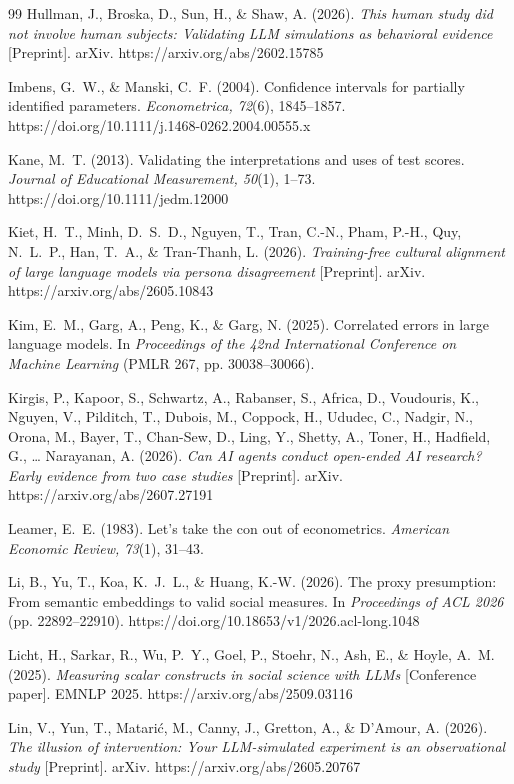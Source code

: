 \documentclass[10pt,letterpaper]{article}
\begin{document}
\begin{thebibliography}{99}
 Hullman, J., Broska, D., Sun, H., \& Shaw, A. (2026). \textit{This human study did not involve human subjects: Validating LLM simulations as behavioral evidence} [Preprint]. arXiv. https://arxiv.org/abs/2602.15785

 Imbens, G.~W., \& Manski, C.~F. (2004). Confidence intervals for partially identified parameters. \textit{Econometrica, 72}(6), 1845--1857. https://doi.org/10.1111/j.1468-0262.2004.00555.x

 Kane, M.~T. (2013). Validating the interpretations and uses of test scores. \textit{Journal of Educational Measurement, 50}(1), 1--73. https://doi.org/10.1111/jedm.12000

 Kiet, H.~T., Minh, D.~S.~D., Nguyen, T., Tran, C.-N., Pham, P.-H., Quy, N.~L.~P., Han, T.~A., \& Tran-Thanh, L. (2026). \textit{Training-free cultural alignment of large language models via persona disagreement} [Preprint]. arXiv. https://arxiv.org/abs/2605.10843

 Kim, E.~M., Garg, A., Peng, K., \& Garg, N. (2025). Correlated errors in large language models. In \textit{Proceedings of the 42nd International Conference on Machine Learning} (PMLR 267, pp. 30038--30066).

 Kirgis, P., Kapoor, S., Schwartz, A., Rabanser, S., Africa, D., Voudouris, K., Nguyen, V., Pilditch, T., Dubois, M., Coppock, H., Ududec, C., Nadgir, N., Orona, M., Bayer, T., Chan-Sew, D., Ling, Y., Shetty, A., Toner, H., Hadfield, G., \ldots{} Narayanan, A. (2026). \textit{Can AI agents conduct open-ended AI research? Early evidence from two case studies} [Preprint]. arXiv. https://arxiv.org/abs/2607.27191

 Leamer, E.~E. (1983). Let's take the con out of econometrics. \textit{American Economic Review, 73}(1), 31--43.

 Li, B., Yu, T., Koa, K.~J.~L., \& Huang, K.-W. (2026). The proxy presumption: From semantic embeddings to valid social measures. In \textit{Proceedings of ACL 2026} (pp. 22892--22910). https://doi.org/10.18653/v1/2026.acl-long.1048

 Licht, H., Sarkar, R., Wu, P.~Y., Goel, P., Stoehr, N., Ash, E., \& Hoyle, A.~M. (2025). \textit{Measuring scalar constructs in social science with LLMs} [Conference paper]. EMNLP 2025. https://arxiv.org/abs/2509.03116

 Lin, V., Yun, T., Matari\'c, M., Canny, J., Gretton, A., \& D'Amour, A. (2026). \textit{The illusion of intervention: Your LLM-simulated experiment is an observational study} [Preprint]. arXiv. https://arxiv.org/abs/2605.20767


\end{thebibliography}
\end{document}
